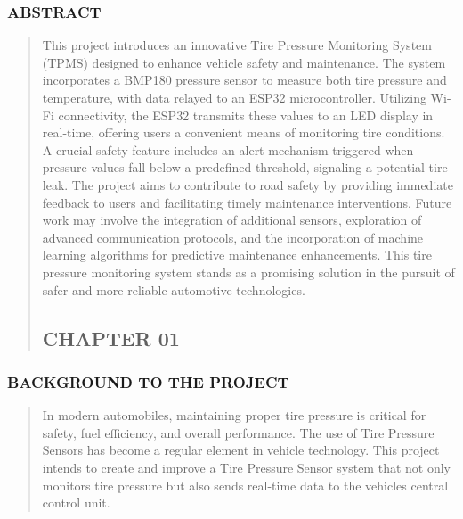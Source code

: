 \documentclass[
]{article}
\begin{document}
\newpage
\hypertarget{abstract}{%
\subsubsection{ABSTRACT}\label{abstract}}

\begin{quote}
This project introduces an innovative Tire Pressure Monitoring System
(TPMS) designed to enhance vehicle safety and maintenance. The system
incorporates a BMP180 pressure sensor to measure both tire pressure and
temperature, with data relayed to an ESP32 microcontroller. Utilizing
Wi-Fi connectivity, the ESP32 transmits these values to an LED display
in real-time, offering users a convenient means of monitoring tire
conditions. A crucial safety feature includes an alert mechanism
triggered when pressure values fall below a predefined threshold,
signaling a potential tire leak. The project aims to contribute to road
safety by providing immediate feedback to users and facilitating timely
maintenance interventions. Future work may involve the integration of
additional sensors, exploration of advanced communication protocols, and
the incorporation of machine learning algorithms for predictive
maintenance enhancements. This tire pressure monitoring system stands as
a promising solution in the pursuit of safer and more reliable
automotive technologies.

\newpage
\hypertarget{chapter-01}{%
\subsection{CHAPTER 01}\label{chapter-01}}
\end{quote}

\hypertarget{background-to-the-project}{%
\subsubsection{BACKGROUND TO THE
PROJECT}\label{background-to-the-project}}

\begin{quote}
In modern automobiles, maintaining proper tire pressure is critical for
safety, fuel efficiency, and overall performance. The use of Tire
Pressure Sensors has become a regular element in vehicle technology.
This project intends to create and improve a Tire Pressure Sensor system
that not only monitors tire pressure but also sends real-time data to
the vehicle\textquotesingle s central control unit.
\end{quote}
\end{document}
